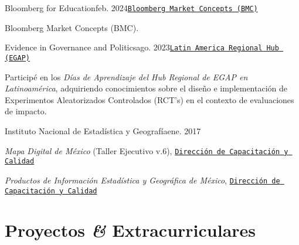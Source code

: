 \documentclass[letter]{resume}
\begin{document}
\begin{content}

\begin{position}{Bloomberg for Education}{feb. 2024}{\normalfont\href{https://portal.bloombergforeducation.com/courses}{\texttt{Bloomberg Market Concepts (BMC)}}}{}{}
\item Bloomberg Market Concepts (BMC).
\end{position}

\begin{position}{Evidence in Governance and Politics}{ago. 2023}{\normalfont\href{https://egap.org/project/learning-days-13-latin-america-regional-hub-workshop/}{\texttt{Latin America Regional Hub (EGAP)}}}{}{}
  \item Participé en los \emph{Días de Aprendizaje del Hub Regional de EGAP en Latinoamérica}, adquiriendo conocimientos sobre el diseño e implementación de Experimentos Aleatorizados Controlados (RCT's) en el contexto de evaluaciones de impacto.
\end{position}

\begin{position}{Instituto Nacional de Estadística y Geografía}{ene. 2017}{}{}{}
  \item \emph{Mapa Digital de México} (Taller Ejecutivo v.6), {\normalfont\href{https://drive.google.com/file/d/11P-V5IOrVxSAdumvZkqc6cNErlPHsWbA/view?usp=sharing}{\texttt{Dirección de Capacitación y Calidad}}}
  \item \emph{Productos de Información Estadística y Geográfica de México}, {\normalfont\href{https://drive.google.com/file/d/175VzjC148czXa4mLOryoo6QfAnEpCx_z/view?usp=sharing}{\texttt{Dirección de Capacitación y Calidad}}}
\end{position}

\end{content}


\section{Proyectos \textbf{\em\&} Extracurriculares}
\end{document}
